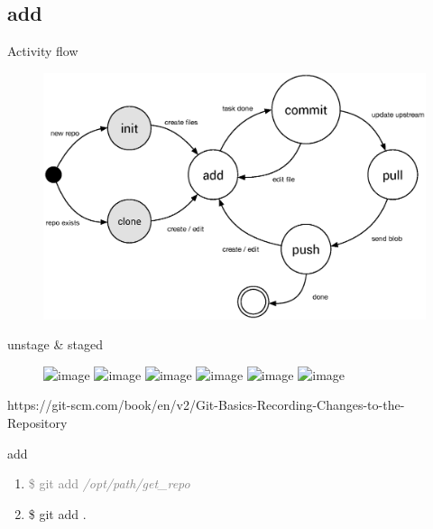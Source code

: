 \documentclass{beamer}
\begin{document}
\subsection[add]{add}
\begin{frame}{Activity flow}
    \begin{figure}
        \center
        \includegraphics[width=.9\textwidth]{git-command-flow-1}
        \label{fig:git-command-flow-1}
    \end{figure}
\end{frame}

\begin{frame}{unstage \& staged}
    \begin{figure}
        \center
        \includegraphics<1>[width=.8\textwidth]{project-changed-0}
        \includegraphics<2>[width=.8\textwidth]{project-changed-1}
        \includegraphics<3>[width=.8\textwidth]{project-changed-2}
        \includegraphics<4>[width=.8\textwidth]{project-changed-3-2}
        \includegraphics<5>[width=.8\textwidth]{project-changed-3-1}
        \includegraphics<6>[width=.8\textwidth]{project-changed-4}
        \label{fig:project-changed}
    \end{figure}
    \small{https://git-scm.com/book/en/v2/Git-Basics-Recording-Changes-to-the-Repository}
\end{frame}

\begin{frame}{add}
    \begin{enumerate}[\$]
        \item<1-> \textcolor<2>{gray}{\Large{\$ git add \em{/opt/path/get\_repo}}}
        \item<2> \Large{\$ git add .}
    \end{enumerate}
\end{frame}
\end{document}
